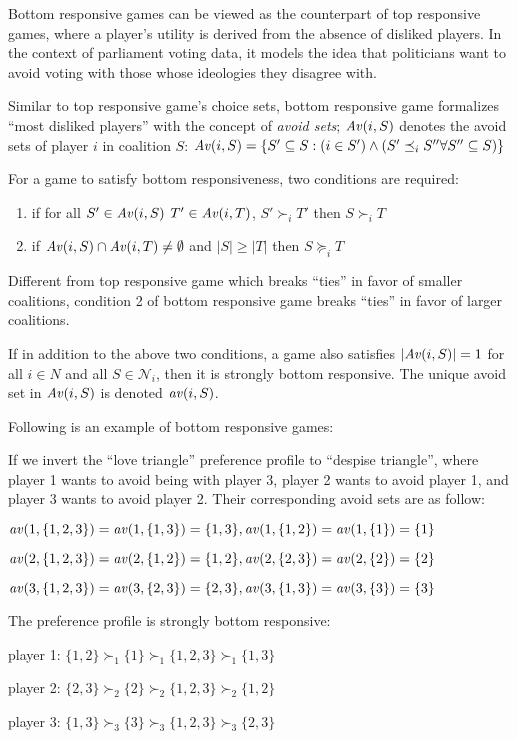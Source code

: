 Bottom responsive games can be viewed as the counterpart of top responsive games,
where a player's utility is derived from the absence of disliked players.
In the context of parliament voting data, it models the idea that politicians want
to avoid voting with those whose ideologies they disagree with.

Similar to top responsive game's choice sets, bottom responsive game formalizes
``most disliked players'' with the concept of \textit{avoid sets};
$\mathit{Av}(i, S)$ denotes the avoid sets of player $i$ in coalition $S$: $\mathit{Av}(i, S) =
\{S' \subseteq S: (i \in S') \wedge (S' \preceq_i S'' \forall S'' \subseteq S)\}$

For a game to satisfy bottom responsiveness, two conditions are required:

\begin{enumerate}
  \item if for all $S' \in \mathit{Av}(i, S)$ $T' \in \mathit{Av}(i, T)$, $ S' \succ_i T'$
    then $S \succ_i T$
  \item if $\mathit{Av}(i, S) \cap \mathit{Av}(i, T) \neq \emptyset$ and $|S| \geq |T|$
    then $S \succeq_i T$
\end{enumerate}

Different from top responsive game which breaks ``ties'' in favor of
smaller coalitions, condition 2 of bottom responsive game breaks ``ties'' in
favor of larger coalitions.

If in addition to the above two conditions, a game also satisfies
$|\mathit{Av}(i, S)| = 1$ for all $i \in N$ and all $S \in \mathcal{N}_i$,
then it is strongly bottom responsive. The unique avoid set in $\mathit{Av}(i, S)$
is denoted $\mathit{av}(i, S)$.

Following is an example of bottom responsive games:

\begin{example}
\label{example:bottom_responsive_pref}
  If we invert the ``love triangle'' preference profile to ``despise triangle'',
  where player 1 wants to avoid being with player 3,
  player 2 wants to avoid player 1, and player 3 wants to avoid player 2.
  Their corresponding avoid sets are as follow:

  $\mathit{av}(1, \{1, 2, 3\}) = \mathit{av}(1, \{1, 3\}) = \{1, 3\},
   \mathit{av}(1, \{1, 2\}) = \mathit{av}(1, \{1\}) = \{1\}$

  $\mathit{av}(2, \{1, 2, 3\}) = \mathit{av}(2, \{1, 2\}) = \{1, 2\},
   \mathit{av}(2, \{2, 3\}) = \mathit{av}(2, \{2\}) = \{2\}$

  $\mathit{av}(3, \{1, 2, 3\}) = \mathit{av}(3, \{2, 3\}) = \{2, 3\},
   \mathit{av}(3, \{1, 3\}) = \mathit{av}(3, \{3\}) = \{3\}$

  The preference profile is strongly bottom responsive:

  player 1: $\{1, 2\} \succ_1 \{1\} \succ_1 \{1, 2, 3\} \succ_1 \{1, 3\}$

  player 2: $\{2, 3\} \succ_2 \{2\} \succ_2 \{1, 2, 3\} \succ_2 \{1, 2\}$

  player 3: $\{1, 3\} \succ_3 \{3\} \succ_3 \{1, 2, 3\} \succ_3 \{2, 3\}$
\end{example}

